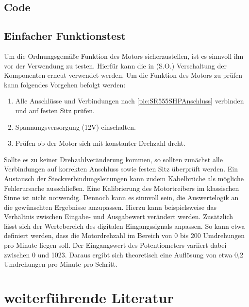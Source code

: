 \subsection{Code}

\subsection{Einfacher Funktionstest}
Um die Ordnungsgemäße Funktion des Motors sicherzustellen, ist es sinnvoll ihn vor der Verwendung zu testen. Hierfür kann die in (S.O.) Verschaltung der Komponenten erneut verwendet werden. Um die Funktion des Motors zu prüfen kann folgendes Vorgehen befolgt werden: 

\begin{center}
	\begin{enumerate}
		\item Alle Anschlüsse und Verbindungen nach \ref{pic:SR555SHPAnschluss} verbinden und auf festen Sitz prüfen. 
		\item Spannungsversorgung (12V) einschalten.   
		\item Prüfen ob der Motor sich mit konstanter Drehzahl dreht. 
	\end{enumerate}  
\end{center}

Sollte es zu keiner Drehzahlveränderung kommen, so sollten zunächst alle Verbindungen auf korrekten Anschluss sowie festen Sitz überprüft werden. Ein Austausch der Steckverbindungsleitungen kann zudem Kabelbrüche als mögliche Fehlerursache ausschließen.
Eine Kalibrierung des Motortreibers im klassischen Sinne ist nicht notwendig. Dennoch kann es sinnvoll sein, die Auswertelogik an die gewünschten Ergebnisse anzupassen. Hierzu kann beispielsweise das Verhältnis zwischen Eingabe- und Ausgabewert verändert werden. Zusätzlich lässt sich der Wertebereich des digitalen Eingangssignals anpassen.
So kann etwa definiert werden, dass die Motordrehzahl im Bereich von 0 bis 200 Umdrehungen pro Minute liegen soll. Der Eingangswert des Potentiometers variiert dabei zwischen 0 und 1023. Daraus ergibt sich theoretisch eine Auflösung von etwa 0,2 Umdrehungen pro Minute pro Schritt.



\section{weiterführende Literatur} 
\begin{center}
	\begin{enumerate}
	\end{enumerate}
\end{center}
